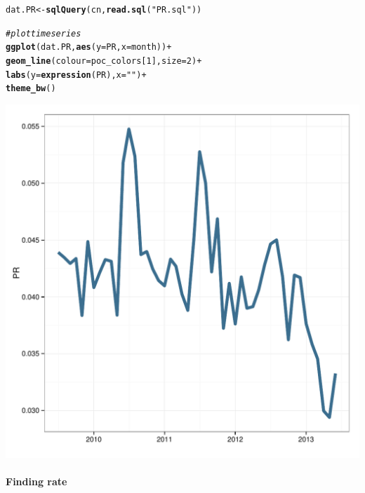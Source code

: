 \documentclass[12pt]{article}\usepackage[]{graphicx}\usepackage[]{color}
\makeatletter
\def\maxwidth{ %
  \ifdim\Gin@nat@width>\linewidth
    \linewidth
  \else
    \Gin@nat@width
  \fi
}
\newcommand{\hlnum}[1]{\textcolor[rgb]{0.686,0.059,0.569}{#1}}%
\newcommand{\hlstr}[1]{\textcolor[rgb]{0.192,0.494,0.8}{#1}}%
\newcommand{\hlcom}[1]{\textcolor[rgb]{0.678,0.584,0.686}{\textit{#1}}}%
\newcommand{\hlopt}[1]{\textcolor[rgb]{0,0,0}{#1}}%
\newcommand{\hlstd}[1]{\textcolor[rgb]{0.345,0.345,0.345}{#1}}%
\newcommand{\hlkwb}[1]{\textcolor[rgb]{0.69,0.353,0.396}{#1}}%
\newcommand{\hlkwc}[1]{\textcolor[rgb]{0.333,0.667,0.333}{#1}}%
\newcommand{\hlkwd}[1]{\textcolor[rgb]{0.737,0.353,0.396}{\textbf{#1}}}%
\newenvironment{kframe}{%
 \def\at@end@of@kframe{}%
 \ifinner\ifhmode%
  \def\at@end@of@kframe{\end{minipage}}%
  \begin{minipage}{\columnwidth}%
 \fi\fi%
 \def\FrameCommand##1{\hskip\@totalleftmargin \hskip-\fboxsep
 \colorbox{shadecolor}{##1}\hskip-\fboxsep
     \hskip-\linewidth \hskip-\@totalleftmargin \hskip\columnwidth}%
 \MakeFramed {\advance\hsize-\width
   \@totalleftmargin\z@ \linewidth\hsize
   \@setminipage}}%
 {\par\unskip\endMakeFramed%
 \at@end@of@kframe}
\newenvironment{knitrout}{}{} %
\makeatother
\begin{document}
\begin{knitrout}
\color{fgcolor}\begin{kframe}
\begin{alltt}
\hlstd{dat.PR} \hlkwb{<-} \hlkwd{sqlQuery}\hlstd{(cn,} \hlkwd{read.sql}\hlstd{(}\hlstr{"PR.sql"}\hlstd{))}

\hlcom{#plot time series}
\hlkwd{ggplot}\hlstd{(dat.PR,} \hlkwd{aes}\hlstd{(}\hlkwc{y}\hlstd{=PR,} \hlkwc{x}\hlstd{=month))} \hlopt{+}
  \hlkwd{geom_line}\hlstd{(}\hlkwc{colour}\hlstd{=poc_colors[}\hlnum{1}\hlstd{],} \hlkwc{size}\hlstd{=}\hlnum{2}\hlstd{)} \hlopt{+}
  \hlkwd{labs}\hlstd{(}\hlkwc{y} \hlstd{=} \hlkwd{expression}\hlstd{(PR),} \hlkwc{x} \hlstd{=} \hlstr{""}\hlstd{)} \hlopt{+}
  \hlkwd{theme_bw}\hlstd{()}
\end{alltt}
\end{kframe}

{\centering \includegraphics[width=\maxwidth]{figure/PR} 

}



\end{knitrout}


\paragraph{Finding rate}
\end{document}
